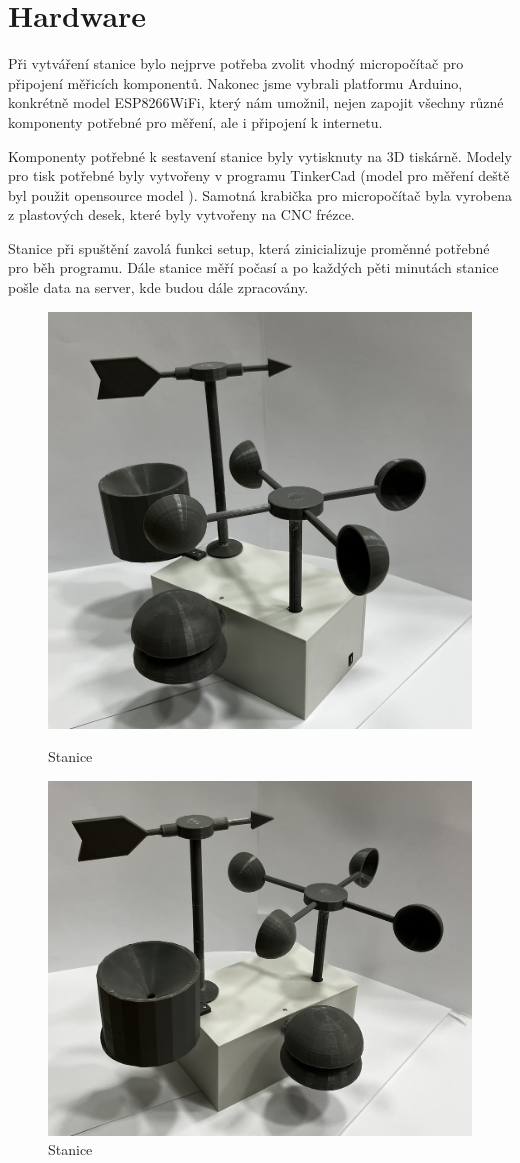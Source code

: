 \section{Hardware}
Při vytváření stanice bylo nejprve potřeba zvolit vhodný micropočítač pro připojení měřicích komponentů. Nakonec jsme vybrali platformu Arduino,
konkrétně model ESP8266WiFi, který nám umožnil, nejen zapojit všechny různé komponenty potřebné pro měření, ale i připojení k internetu.

Komponenty potřebné k sestavení stanice byly vytisknuty na 3D tiskárně. Modely pro tisk potřebné byly vytvořeny v programu TinkerCad
(model pro měření deště byl použit opensource model \cite{mereni_deste}). Samotná krabička pro micropočítač byla vyrobena z plastových desek,
které byly vytvořeny na CNC frézce.  

Stanice při spuštění zavolá funkci setup, která zinicializuje proměnné potřebné pro běh programu. 
Dále stanice měří počasí a po každých pěti minutách stanice pošle data na server, kde budou dále zpracovány.

\begin{figure}[!htb]
   \begin{minipage}{0.48\textwidth}
     \centering
     \includegraphics[width=.7\linewidth]{images/stanice0.jpg}
     \caption{Stanice}
   \end{minipage}\hfill
   \begin{minipage}{0.5\textwidth}
     \centering
     \includegraphics[width=.7\linewidth]{images/stanice1.jpg}
     \caption{Stanice}
   \end{minipage}
\end{figure}
